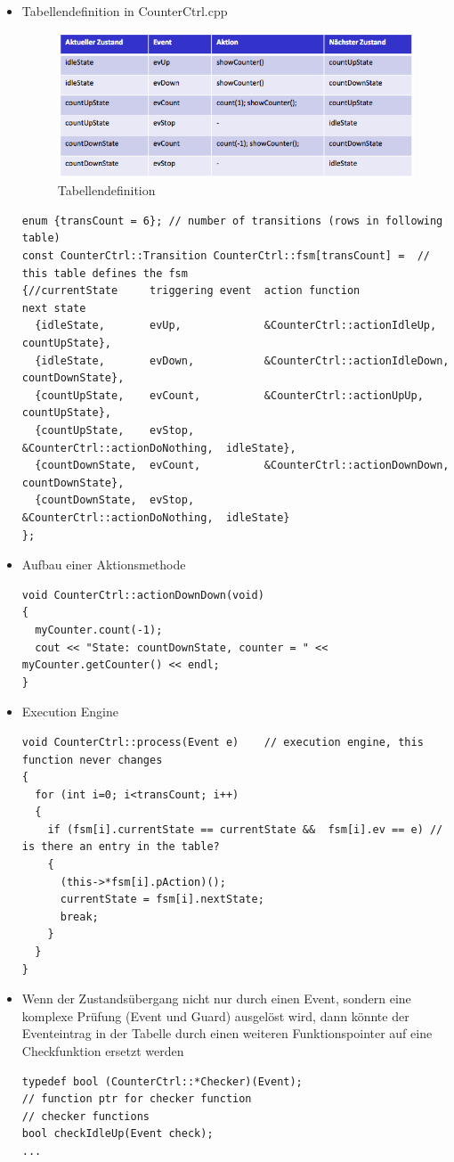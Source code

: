 \begin{itemize}
\item Tabellendefinition in CounterCtrl.cpp
\begin{figure}[h]
  \centering
  {\includegraphics[scale = 0.5]{images/FSM/tabelle}  
  \caption{Tabellendefinition}
  \label{fig:tabelle}}
\end{figure}
\begin{lstlisting}[style=Cpp]
enum {transCount = 6}; // number of transitions (rows in following table)
const CounterCtrl::Transition CounterCtrl::fsm[transCount] =  // this table defines the fsm
{//currentState     triggering event  action function                 next state
  {idleState,       evUp,             &CounterCtrl::actionIdleUp,     countUpState},
  {idleState,       evDown,           &CounterCtrl::actionIdleDown,   countDownState},
  {countUpState,    evCount,          &CounterCtrl::actionUpUp,       countUpState},
  {countUpState,    evStop,           &CounterCtrl::actionDoNothing,  idleState},
  {countDownState,  evCount,          &CounterCtrl::actionDownDown,   countDownState},
  {countDownState,  evStop,           &CounterCtrl::actionDoNothing,  idleState}
};
\end{lstlisting}
\item Aufbau einer Aktionsmethode
\begin{lstlisting}[style=Cpp]
void CounterCtrl::actionDownDown(void)
{
  myCounter.count(-1);
  cout << "State: countDownState, counter = " << myCounter.getCounter() << endl;
}
\end{lstlisting}
\item Execution Engine
\begin{lstlisting}[style=Cpp]
void CounterCtrl::process(Event e)    // execution engine, this function never changes
{
  for (int i=0; i<transCount; i++)
  {
    if (fsm[i].currentState == currentState &&  fsm[i].ev == e) // is there an entry in the table?
    {
      (this->*fsm[i].pAction)();
      currentState = fsm[i].nextState;
      break;
    }
  }
}
\end{lstlisting}
\item Wenn der Zustandsübergang nicht nur durch einen Event, sondern eine
komplexe Prüfung (Event und Guard) ausgelöst wird, dann könnte der Eventeintrag
in der Tabelle durch einen weiteren Funktionspointer auf eine Checkfunktion
ersetzt werden
\begin{lstlisting}[style=Cpp]
typedef bool (CounterCtrl::*Checker)(Event);
// function ptr for checker function 
// checker functions
bool checkIdleUp(Event check); 
...


\end{lstlisting}
\end{itemize}
